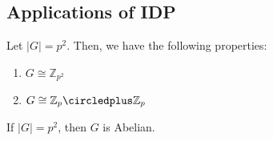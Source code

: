 \subsection{Applications of IDP}

\begin{theorem}
    Let \(|G| = p^2\). Then, we have the following properties:
    \begin{enumerate}
        \item \(G \cong \mathbb{Z}_{p^2}\)
        \item \(G \cong \mathbb{Z}_p \circledplus \mathbb{Z}_p\)
    \end{enumerate}
\end{theorem}

\begin{corollary}
    If \(|G| = p^2\), then \(G\) is Abelian.
\end{corollary}
